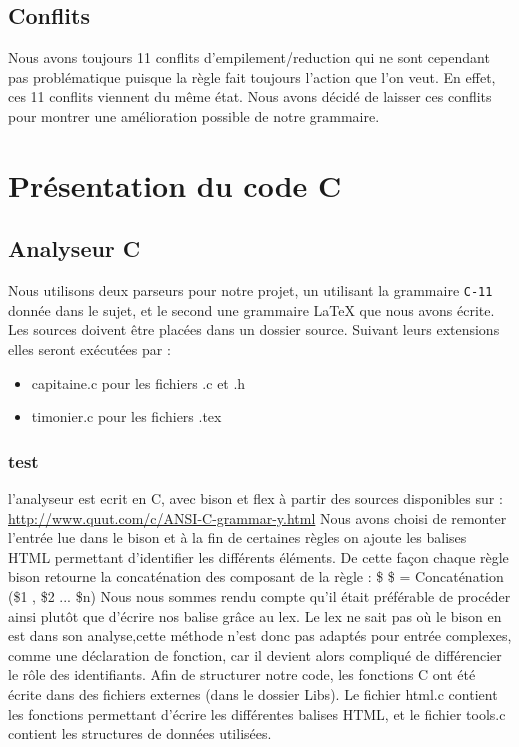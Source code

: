 \documentclass{report}
\begin{document}
\section{Conflits}
Nous avons toujours 11 conflits d'empilement/reduction qui ne sont cependant pas problématique puisque la règle fait toujours l'action que l'on veut. En effet, ces 11 conflits viennent du même état.
Nous avons décidé de laisser ces conflits pour montrer une amélioration possible de notre grammaire.
\chapter{Présentation du code C}
\section{Analyseur C}{
Nous utilisons deux parseurs pour notre projet, un utilisant la grammaire \texttt{C-11} donnée dans le sujet, et le second une grammaire LaTeX que nous avons écrite.
	Les sources doivent être placées dans un dossier source. Suivant leurs extensions elles seront exécutées par :
	\begin{itemize}
	\item capitaine.c pour les fichiers .c et .h
	\item timonier.c pour les fichiers .tex
	\end{itemize}
\subsection{test}{
	l'analyseur est ecrit en C, avec bison et flex à partir des sources disponibles sur : \url{http://www.quut.com/c/ANSI-C-grammar-y.html}
	Nous avons choisi de remonter l'entrée lue dans le bison et à la fin de certaines règles on ajoute les balises HTML permettant d'identifier les différents éléments.
	De cette façon chaque règle bison retourne la concaténation des composant de la règle : \$ \$ = Concaténation (\$1 , \$2 ... \$n)
	Nous nous sommes rendu compte qu'il était préférable de procéder ainsi plutôt que d'écrire nos balise grâce au lex. Le lex ne sait pas où le bison en est dans son analyse,cette méthode n'est donc pas adaptés pour entrée complexes, comme une déclaration de fonction, car il devient alors compliqué de différencier le rôle des identifiants.
Afin de structurer notre code, les fonctions C ont été écrite dans des fichiers externes (dans le dossier Libs). Le fichier html.c contient les fonctions permettant d'écrire les différentes balises HTML, et le fichier tools.c contient les structures de données utilisées.
}
}
\end{document}
